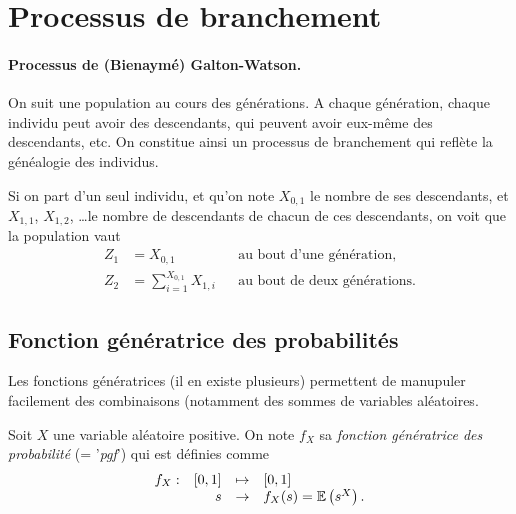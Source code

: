 \section{Processus de branchement} \label{sec:Proba-Branchement}

\paragraph*{Processus de (Bienaymé) Galton-Watson.}
On suit une population au cours des générations. A chaque génération, chaque individu peut avoir des descendants, qui peuvent avoir eux-même des descendants, etc. On constitue ainsi un processus de branchement qui reflète la généalogie des individus.

Si on part d'un seul individu, et qu'on note $X_{0, 1}$ le nombre de ses descendants, et $X_{1, 1}$, $X_{1, 2}$, \dots le nombre de descendants de chacun de ces descendants, on voit que la population vaut
\begin{align*}
  Z_1 & = X_{0, 1} && \text{au bout d'une génération}, \\
  Z_2 & = \sum_{i=1}^{X_{0, 1}} X_{1, i} && \text{au bout de deux générations}.
\end{align*}

\subsection{Fonction génératrice des probabilités} 

Les fonctions génératrices (il en existe plusieurs) permettent de manupuler facilement des combinaisons (notamment des sommes de variables aléatoires.

\begin{definition}
  Soit $X$ une variable aléatoire positive. On note $f_X$ sa {\em fonction génératrice des probabilité} (= '{\em pgf}') qui est définies comme
  $$
  \begin{array}{rrcl}
    f_X : & [0, 1] & \mapsto & [0, 1] \\
      & s & \to & f_X(s) = \operatorname{\mathbb{E}}\left(s^X\right).
  \end{array}
  $$
\end{definition}

